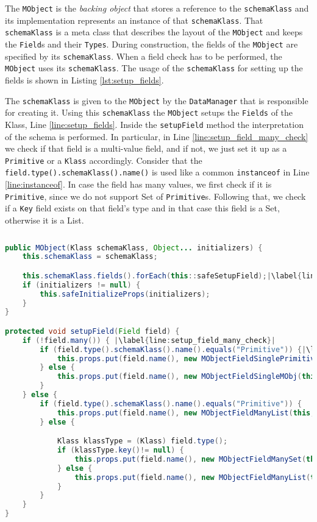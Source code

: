 The \texttt{MObject} is the \textit{backing object} that stores a reference to the \texttt{schemaKlass} and its implementation represents an instance of that \texttt{schemaKlass}.
That \texttt{schemaKlass} is a meta class that describes the layout of the \texttt{MObject} and keeps the \texttt{Field}s and their \texttt{Types}.
During construction, the fields of the \texttt{MObject} are specified by its \texttt{schemaKlass}.
When a field check has to be performed, the \texttt{MObject} uses its \texttt{schemaKlass}.
The usage of the \texttt{schemaKlass} for setting up the fields is shown in Listing \ref{lst:setup_fields}.

The \texttt{schemaKlass} is given to the \texttt{MObject} by the \texttt{DataManager} that is responsible for creating it.
Using this \texttt{schemaKlass} the \texttt{MObject} setups the \texttt{Fields} of the Klass, Line \ref{line:setup_fields}.
Inside the \texttt{setupField} method the interpretation of the schema is performed.
In particular, in Line \ref{line:setup_field_many_check} we check if that field is a multi-value field, and if not, we just set it up as a \texttt{Primitive} or a \texttt{Klass} accordingly. 
Consider that the \texttt{field.type().schemaKlass().name()} is used like a common \texttt{instanceof} in Line \ref{line:instanceof}.
In case the field has many values, we first check if it is \texttt{Primitive}, since we do not support Set of \texttt{Primitive}s.
Following that, we check if a \texttt{Key} field exists on that field's type and in that case this field is a Set, otherwise it is a List.

\begin{sourcecode}
	\begin{lstlisting}[language=Java, escapechar=|]
public MObject(Klass schemaKlass, Object... initializers) {
	this.schemaKlass = schemaKlass;

	this.schemaKlass.fields().forEach(this::safeSetupField);|\label{line:setup_fields}|
	if (initializers != null) {
		this.safeInitializeProps(initializers);
	}
}

protected void setupField(Field field) {
	if (!field.many()) { |\label{line:setup_field_many_check}|
		if (field.type().schemaKlass().name().equals("Primitive")) {|\label{line:instanceof}|
			this.props.put(field.name(), new MObjectFieldSinglePrimitive(this, field));
		} else {
			this.props.put(field.name(), new MObjectFieldSingleMObj(this, field));
		}
	} else {
		if (field.type().schemaKlass().name().equals("Primitive")) {
			this.props.put(field.name(), new MObjectFieldManyList(this, field));
		} else {

			Klass klassType = (Klass) field.type();
			if (klassType.key()!= null) {
				this.props.put(field.name(), new MObjectFieldManySet(this, field));
			} else {
				this.props.put(field.name(), new MObjectFieldManyList(this, field));
			}
		}
	}
}
	\end{lstlisting}
	\caption{MObject: setup fields}
	\label{lst:setup_fields}
\end{sourcecode}

